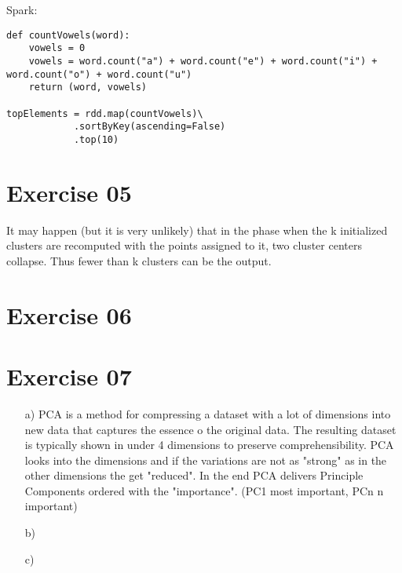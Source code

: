\documentclass[11pt,a4paper]{scrartcl}
\begin{document}
Spark:
\begin{lstlisting}
def countVowels(word):
	vowels = 0
	vowels = word.count("a") + word.count("e") + word.count("i") + word.count("o") + word.count("u")
	return (word, vowels)
	
topElements = rdd.map(countVowels)\
			.sortByKey(ascending=False)
			.top(10)
\end{lstlisting}

\section*{Exercise 05}
It may happen (but it is very unlikely) that in the phase when the k initialized clusters are recomputed with the points assigned to it, two cluster centers collapse. Thus fewer than k clusters can be the output.

\section*{Exercise 06}


\section*{Exercise 07}
\begin{itemize}
	\item[a)] PCA is a method for compressing a dataset with a lot of dimensions into new data that captures the essence o the original data. The resulting dataset is typically shown in under 4 dimensions to preserve comprehensibility. PCA looks into the dimensions and if the variations are not as "strong" as in the other dimensions the get "reduced". In the end PCA delivers Principle Components ordered with the "importance". (PC1 most important, PCn n important)
	\item[b)] 
	\item[c)]
\end{itemize}
\end{document}
